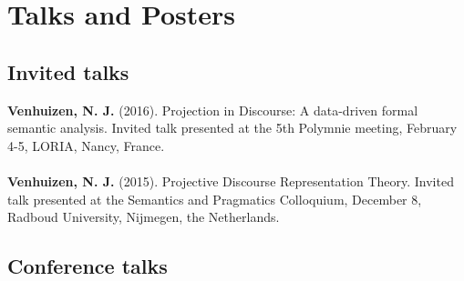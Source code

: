 \documentclass[a4paper,10pt]{article}
\begin{document}
\section*{Talks and Posters}

    
\subsection*{Invited talks}

\noindent
    \textbf{Venhuizen, N. J.} (2016). Projection in Discourse: A data-driven
    formal semantic analysis. Invited talk presented at the 5th Polymnie
    meeting, February 4-5, LORIA, Nancy, France.\\
    \\
    \textbf{Venhuizen, N. J.} (2015). Projective Discourse Representation
    Theory. Invited talk presented at the Semantics and Pragmatics
    Colloquium, December 8, Radboud University, Nijmegen, the Netherlands.

\subsection*{Conference talks}
\end{document}
